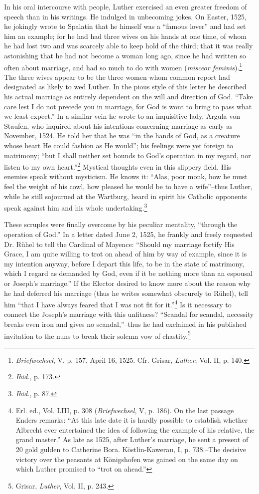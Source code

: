In his oral intercourse with people, Luther exercised an even greater
freedom of speech than in his writings. He indulged in unbecoming
jokes. On Easter, 1525, he jokingly wrote to Spalatin that he himself
was a “famous lover” and had set him an example; for he had had
three wives on his hands at one time, of whom he had lost two and
was scarcely able to keep hold of the third; that it was really astonishing
that he had not become a woman long ago, since he had written
so often about marriage, and had so much to do with women (\textit{misceor
feminis}).\footnote
{\textit{Briefwechsel}, V, p. 157, April 16, 1525. Cfr. Grisar, \textit{Luther}, Vol. II, p. 140.}
The three wives appear to be the three women whom
common report had designated as likely to wed Luther.
In the pious style of this letter he described his actual marriage as
entirely dependent on the will and direction of God. “Take care lest
I do not precede you in marriage, for God is wont to bring to pass
what we least expect.” In a similar vein he wrote to an inquisitive
lady, Argula von Staufen, who inquired about his intentions concerning
marriage as early as November, 1524. He told her that he was
“in the hands of God, as a creature whose heart He could fashion as
He would”; his feelings were yet foreign to matrimony; “but I shall
neither set bounds to God’s operation in my regard, nor listen to my
own heart.”\footnote{\textit{Ibid.}, p. 173.}
Mystical thoughts even in this slippery field. His enemies
speak without mysticism. He knows it: “Alas, poor monk, how
he must feel the weight of his cowl, how pleased he would be to have
a wife”--thus Luther, while he still sojourned at the Wartburg, heard
in spirit his Catholic opponents speak against him and his whole undertaking.\footnote
{\textit{Ibid.}, p. 87.}

These scruples were finally overcome by his peculiar mentality,
“through the operation of God.” In a letter dated June 2, 1525, he
frankly and freely requested Dr. Rühel to tell the Cardinal of Mayence:
“Should my marriage fortify His Grace, I am quite willing to
trot on ahead of him by way of example, since it is my intention anyway,
before I depart this life, to be in the state of matrimony, which
I regard as demanded by God, even if it be nothing more than an
espousal or Joseph’s marriage.” If the Elector desired to know more
about the reason why he had deferred his marriage (thus he writes
somewhat obscurely to Rühel), tell him “that I have always feared
that I was not fit for it.”\footnote
{Erl. ed., Vol. LIII, p. 308 (\textit{Briefwechsel}, V, p. 186). On the last passage Enders remarks:
``At this late date it is hardly possible to establish whether Albrecht ever entertained
the idea of following the example of his relative, the grand master.'' As late as
1525, after Luther's marriage, he sent a present of 20 gold gulden to Catherine Bora.
Köstlin-Kawerau, I, p. 738.--The decisive victory over the peasants at Königshofen was
gained on the same day on which Luther promised to ``trot on ahead.''}
Is it necessary to connect the Joseph’s
marriage with this unfitness? “Scandal for scandal, necessity breaks
even iron and gives no scandal,”--thus he had exclaimed in his published
invitation to the nuns to break their solemn vow of chastity.\footnote
{Grisar, \textit{Luther}, Vol. II, p. 243. }

